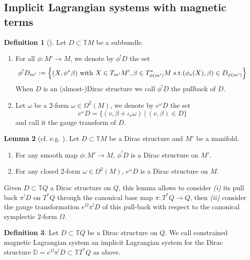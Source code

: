 \documentclass[a4paper,12pt]{amsart}
\theoremstyle{definition}
\newtheorem{Definition}{Definition}[section]
\newtheorem{Lemma}[Definition]{Lemma}
\begin{document}
\subsection{Implicit Lagrangian systems with magnetic terms}
\label{magnetic}


 
 \begin{Definition}[\cite{burs}] Let $D \subset \mathbb T M$ be a subbundle.
 \begin{enumerate}
     \item For all $\phi\colon M' \to M $, we denote by  $\phi^!D$ the set 
     $$\phi^! D_{m'}  := \left\{ (X,\phi^* \beta)    \hbox{ with }  X \in T_{m'}M', \beta \in T_{\phi(m')}^*  M\hbox{ s.t.} (\phi_*(X), \beta) \in D_{\phi(m')}  \right\} $$
     When $D$ is an (almost-)Dirac structure we call $\phi^!D$ the pullback of $D$.
     \item Let $\omega$ be a $2$-form $\omega\in \Omega^2(M)$, we denote by $e^\omega D$ the set 
     $$e^\omega D=\{(v,\beta +\iota_v\omega)~|~ (v,\beta)\in D  \}$$
     and call it the gauge transform of $D$. 
 \end{enumerate}
\end{Definition}

\begin{Lemma}[cf. e.g. \cite{burs}] Let $D \subset \mathbb TM$ be a Dirac structure and $M'$ be a manifold. 
\begin{enumerate}
    \item For any smooth map $\phi\colon M' \to M $, $\phi^!D$ is a Dirac structure on $M'$.
    \item For any closed 2-form $\omega \in \Omega^2(M)$, $e^\omega D$ is a Dirac structure on $M$.
\end{enumerate}
\end{Lemma}

Given $D\subset \mathbb TQ$ a Dirac structure on $Q$, this lemma allows to consider \emph{(i)} its pull back $\pi^! D $ on $T^* Q $ through the canonical base map $ \pi\colon T^* Q \to Q$, then \emph{(ii)} consider the gauge transformation $e^\Omega \pi^! D $ of this pull-back with respect to the canonical symplectic $2$-form $\Omega$.

 \begin{Definition}
 Let $D\subset \mathbb TQ$ be a Dirac structure on $Q$. We call constrained magnetic Lagrangian system an implicit Lagrangian system for the Dirac structure $\mathbb D=e^\Omega\pi^!D\subset \mathbb TT^*Q$ as above. 
 \end{Definition}
 
\end{document}
